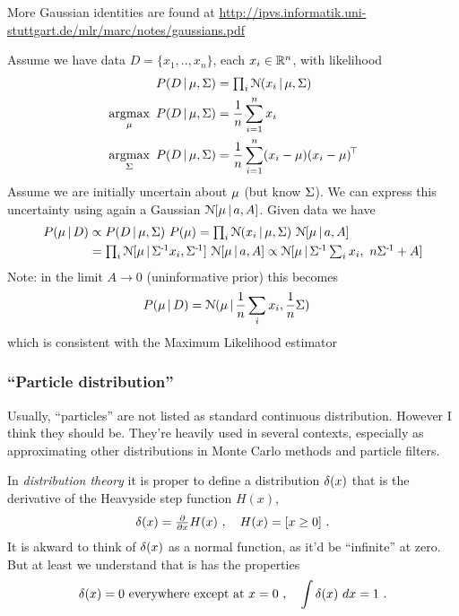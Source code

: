More Gaussian identities are found at {\tiny\url{http://ipvs.informatik.uni-stuttgart.de/mlr/marc/notes/gaussians.pdf}}

\begin{myExample} Assume we have data $D
= \{x_1,..,x_n\}$, each $x_i\in\RRR^n$, with likelihood
\begin{align}
P(D\|\m,\S)
&= \Prod_i \NN(x_i\|\m,\S) \\
\argmax_\m~ P(D\|\m,\S)
&= \frac{1}{n}\sum_{i=1}^n x_i \\
\argmax_\S~ P(D\|\m,\S)
&= \frac{1}{n} \sum_{i=1}^n (x_i-\m)(x_i-\m)^\T
\end{align}
 Assume we are initially uncertain about $\m$ (but know $\S$). We
can express this uncertainty using again a Gaussian $\NN[\m \|
a,A]$. Given data we have
\begin{align}
P(\m\|D)
&\propto P(D\|\m,\S)~ P(\m)
 = \Prod_i \NN(x_i\| \m,\S)~ \NN[\m \| a, A] \\
&= \Prod_i \NN[\m\| \S^\1 x_i,\S^\1]~ \NN[\m \| a, A]
 \propto \NN[\m \| \S^\1 \sum_i x_i,~ n\S^\1 + A]
\end{align}
Note: in the limit $A\to 0$ (uninformative prior) this becomes
\begin{align}
P(\m\|D)
 &= \NN(\m \| \frac{1}{n}\sum_i x_i, \frac{1}{n}\S)
\end{align}
which is consistent with the Maximum Likelihood estimator
\end{myExample}

\subsubsection{``Particle distribution''}

Usually, ``particles'' are not listed as standard continuous
distribution. However I think they should be. They're heavily used in
several contexts, especially as approximating other distributions in
Monte Carlo methods and particle filters.

\begin{myDefinition} In \emph{distribution
theory} it is proper to define a distribution $\d(x)$ that is the
derivative of the Heavyside step function $H(x)$,
\begin{equation}
\d(x) = \Del{x} H(x) \comma H(x) = [x\ge0] ~.
\end{equation}
It is akward to think of $\d(x)$ as a normal function, as it'd be
``infinite'' at zero. But at least we understand that is has the
properties
\begin{equation}
\d(x) = 0 \text{~everywhere except at~} x=0 \comma \int\d(x)~dx =
1 ~.
\end{equation}
\end{myDefinition}

